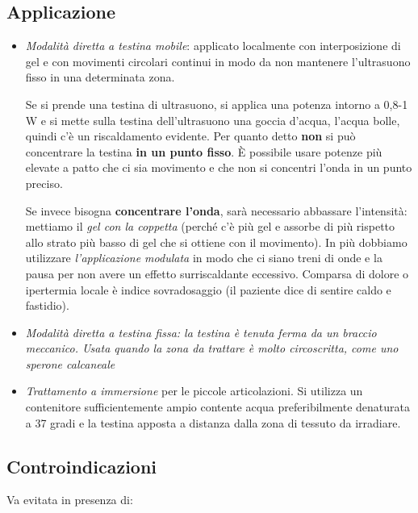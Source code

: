 \subsection{Applicazione}

\begin{itemize}
\item
  \emph{Modalità diretta} \emph{a testina mobile}: applicato localmente
  con interposizione di gel e con movimenti circolari continui in modo
  da non mantenere l'ultrasuono fisso in una determinata zona.

Se si prende una testina di ultrasuono, si applica una potenza intorno a
0,8-1 W e si mette sulla testina dell'ultrasuono una goccia d'acqua,
l'acqua bolle, quindi c'è un riscaldamento evidente. Per quanto detto
\textbf{non} si può concentrare la testina \textbf{in un punto fisso}. È
possibile usare potenze più elevate a patto che ci sia movimento e che
non si concentri l'onda in un punto preciso.

Se invece bisogna \textbf{concentrare l'onda}, sarà necessario abbassare
l'intensità: mettiamo il \emph{gel con la coppetta} (perché c'è più gel
e assorbe di più rispetto allo strato più basso di gel che si ottiene
con il movimento). In più dobbiamo utilizzare \emph{l'applicazione
modulata} in modo che ci siano treni di onde e la pausa per non avere un
effetto surriscaldante eccessivo. Comparsa di dolore o ipertermia locale
è indice sovradosaggio (il paziente dice di sentire caldo e fastidio).

\item
  \emph{\emph{Modalità diretta a testina fissa: la testina è tenuta
  ferma da un braccio meccanico. Usata quando la zona da trattare è
  molto circoscritta, come uno sperone calcaneale}}
\item
  \emph{Trattamento a immersione} per le piccole articolazioni. Si
  utilizza un contenitore sufficientemente ampio contente acqua
  preferibilmente denaturata a 37 gradi e la testina apposta a distanza
  dalla zona di tessuto da irradiare.
\end{itemize}

\subsection{Controindicazioni}

Va evitata in presenza di:

